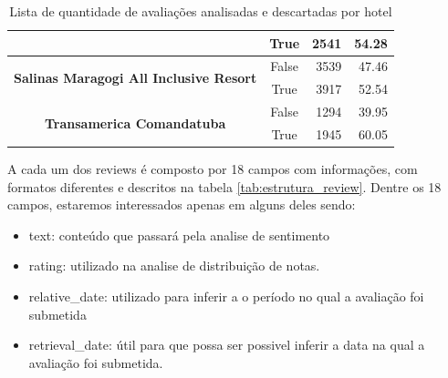 \begin{table}[]
\begin{tabular}{|c|c|r|r|}
		                                                                        &
		True                                                                    &
		2541                                                                    &
		54.28                                                                     \\ \hline
		\multirow{2}{*}{\textbf{Salinas Maragogi All Inclusive Resort}}         &
		False                                                                   &
		3539                                                                    &
		47.46                                                                     \\ \cline{2-4}
		                                                                        &
		True                                                                    &
		3917                                                                    &
		52.54                                                                     \\ \hline
		\multirow{2}{*}{\textbf{Transamerica Comandatuba}}                      &
		False                                                                   &
		1294                                                                    &
		39.95                                                                     \\ \cline{2-4}
		                                                                        &
		True                                                                    &
		1945                                                                    &
		60.05                                                                     \\ \hline
	\end{tabular}
	\caption{Lista de quantidade de avaliações analisadas e descartadas por hotel}
	\label{tab:lista_review_hoteis}
\end{table}%
%

A cada um dos reviews é composto por 18 campos com informações, com formatos diferentes e descritos na tabela \ref{tab:estrutura_review}. Dentre os 18 campos, estaremos interessados apenas em alguns deles sendo:
\begin{itemize}
	\item text: conteúdo que passará pela analise de sentimento
	\item rating: utilizado na analise de distribuição de notas.
	\item relative\_date: utilizado para inferir a o período no qual a avaliação foi submetida
	\item retrieval\_date: útil para que possa ser possivel inferir a data na qual a avaliação foi submetida.
\end{itemize}

